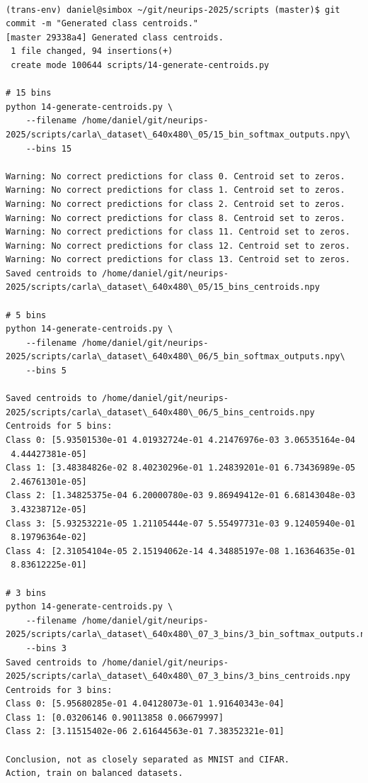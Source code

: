 \begin{verbatim}

(trans-env) daniel@simbox ~/git/neurips-2025/scripts (master)$ git commit -m "Generated class centroids."
[master 29338a4] Generated class centroids.
 1 file changed, 94 insertions(+)
 create mode 100644 scripts/14-generate-centroids.py

# 15 bins
python 14-generate-centroids.py \
    --filename /home/daniel/git/neurips-2025/scripts/carla\_dataset\_640x480\_05/15_bin_softmax_outputs.npy\
    --bins 15

Warning: No correct predictions for class 0. Centroid set to zeros.
Warning: No correct predictions for class 1. Centroid set to zeros.
Warning: No correct predictions for class 2. Centroid set to zeros.
Warning: No correct predictions for class 8. Centroid set to zeros.
Warning: No correct predictions for class 11. Centroid set to zeros.
Warning: No correct predictions for class 12. Centroid set to zeros.
Warning: No correct predictions for class 13. Centroid set to zeros.
Saved centroids to /home/daniel/git/neurips-2025/scripts/carla\_dataset\_640x480\_05/15_bins_centroids.npy

# 5 bins
python 14-generate-centroids.py \
    --filename /home/daniel/git/neurips-2025/scripts/carla\_dataset\_640x480\_06/5_bin_softmax_outputs.npy\
    --bins 5

Saved centroids to /home/daniel/git/neurips-2025/scripts/carla\_dataset\_640x480\_06/5_bins_centroids.npy
Centroids for 5 bins:
Class 0: [5.93501530e-01 4.01932724e-01 4.21476976e-03 3.06535164e-04
 4.44427381e-05]
Class 1: [3.48384826e-02 8.40230296e-01 1.24839201e-01 6.73436989e-05
 2.46761301e-05]
Class 2: [1.34825375e-04 6.20000780e-03 9.86949412e-01 6.68143048e-03
 3.43238712e-05]
Class 3: [5.93253221e-05 1.21105444e-07 5.55497731e-03 9.12405940e-01
 8.19796364e-02]
Class 4: [2.31054104e-05 2.15194062e-14 4.34885197e-08 1.16364635e-01
 8.83612225e-01]
 
# 3 bins
python 14-generate-centroids.py \
    --filename /home/daniel/git/neurips-2025/scripts/carla\_dataset\_640x480\_07_3_bins/3_bin_softmax_outputs.npy\
    --bins 3
Saved centroids to /home/daniel/git/neurips-2025/scripts/carla\_dataset\_640x480\_07_3_bins/3_bins_centroids.npy
Centroids for 3 bins:
Class 0: [5.95680285e-01 4.04128073e-01 1.91640343e-04]
Class 1: [0.03206146 0.90113858 0.06679997]
Class 2: [3.11515402e-06 2.61644563e-01 7.38352321e-01]

Conclusion, not as closely separated as MNIST and CIFAR.
Action, train on balanced datasets.

\end{verbatim}

